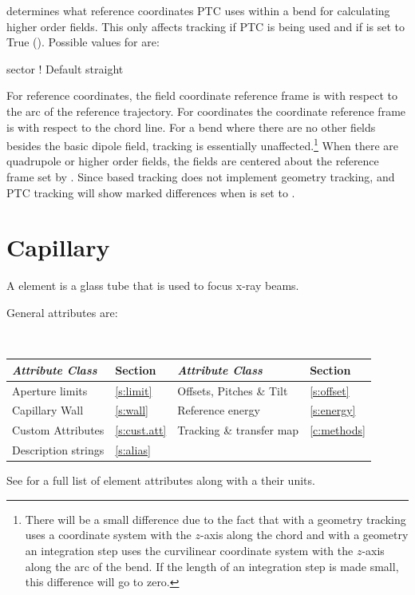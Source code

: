  determines what reference coordinates PTC uses within a bend for calculating
higher order fields. This only affects tracking if PTC is being used and if
 is set to True (). Possible values for
 are:
\begin{example}
  sector      ! Default
  straight
\end{example}
For  reference coordinates, the field coordinate reference frame is with respect to the
arc of the reference trajectory. For  coordinates the coordinate reference frame is
with respect to the chord line. For a bend where there are no other fields besides the basic dipole
field, tracking is essentially unaffected.\footnote
  {
There will be a small difference due to the fact that with a  geometry tracking uses a
coordinate system with the $z$-axis along the chord and with a  geometry an integration step
uses the curvilinear coordinate system with the $z$-axis along the arc of the bend. If the length
of an integration step is made small, this difference will go to zero.
  }
When there are quadrupole or higher order fields, the fields are centered about the reference frame
set by . Since \bmad based tracking does not implement  geometry
tracking, \bmad and PTC tracking will show marked differences when  is set to
.

\newpage

\section{Capillary}
\label{s:capillary}

A  element is a glass tube that is used to focus x-ray
beams.

General  attributes are:
\begin{center}
\tt
\begin{tabular}{llll} \toprule
  {\sl Attribute Class}      & Section          & {\sl Attribute Class}      & Section         \\ \midrule
  Aperture limits            & \ref{s:limit}    & Offsets, Pitches \& Tilt   & \ref{s:offset}  \\ 
  Capillary Wall             & \ref{s:wall}     & Reference energy           & \ref{s:energy}  \\
  Custom Attributes          & \ref{s:cust.att} & Tracking \& transfer map   & \ref{c:methods} \\ 
  Description strings        & \ref{s:alias}    &                            &                 \\
  \bottomrule
\end{tabular}
\end{center}
\toffset
See  for a full list of element attributes along with a their units.

